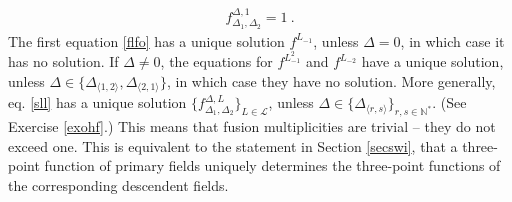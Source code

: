 \documentclass[12pt,a4paper,notitlepage]{report}
\numberwithin{equation}{section}
\theoremstyle{break}
\begin{document}
\begin{align}
 f^{\Delta,1}_{\Delta_1,\Delta_2} = 1\ .
\label{fo}
\end{align}
The first equation \eqref{flfo} has a unique solution $f^{L_{-1}}$, unless $\Delta=0$, in which case it has no solution.
If $\Delta \neq 0$, the equations for $f^{L_{-1}^2}$ and $f^{L_{-2}}$ have a unique solution, unless $\Delta \in \{\Delta_{\langle 1,2 \rangle}, \Delta_{\langle 2,1 \rangle}\}$, in which case they have no solution.
More generally, eq. \eqref{sll} has a unique solution $\{ f^{\Delta,L}_{\Delta_1,\Delta_2} \}_{L\in\mathcal{L}}$, unless $\Delta\in\{\Delta_{\langle r,s \rangle}\}_{r,s\in {\mathbb{N}}^*}$. 
(See Exercise \ref{exohf}.) This means that fusion multiplicities are trivial -- they do not exceed one. 
This is equivalent to the statement in Section \ref{secswi}, that a three-point function of primary fields uniquely determines the three-point functions of the corresponding descendent fields. 
\end{document}
